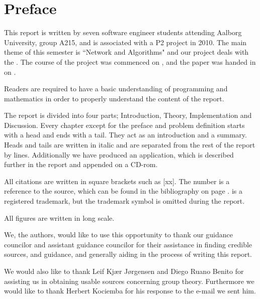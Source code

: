 \chapter*{Preface}
\emptyTop{}

This report is written by seven software engineer students attending Aalborg University, group A215, and is associated with a P2 project in 2010.
The main theme of this semester is ``Network and Algorithms" and our project deals with the \rubik{}.
The course of the project was commenced on , and the paper was handed in on .

Readers are required to have a basic understanding of programming and mathematics in order to properly understand the content of the report. 

The report is divided into four parts; Introduction, Theory, Implementation and Discussion. Every chapter except for the preface and problem definition starts with a head and ends with a tail. They act as an introduction and a summary. Heads and tails are written in italic and are separated from the rest of the report by lines. 
Additionally we have produced an application, which is described further in the report and appended on a CD-rom.

All citations are written in square brackets such as [xx]. The number is a reference to the source, which can be found in the bibliography on page \pageref{chap:bib}. 
\rubik{} is a registered trademark, but the trademark symbol is omitted during the report.

All figures are written in long scale.%

We, the authors, would like to use this opportunity to thank our guidance councilor and assistant guidance councilor for their assistance in finding credible sources, and guidance, and generally aiding in the process of writing this report. 

We would also like to thank Leif Kj\ae{}r J\o{}rgensen and Diego Ruano Benito for assisting us in obtaining usable sources concerning group theory.
Furthermore we would like to thank Herbert Kociemba for his response to the e-mail we sent him.
